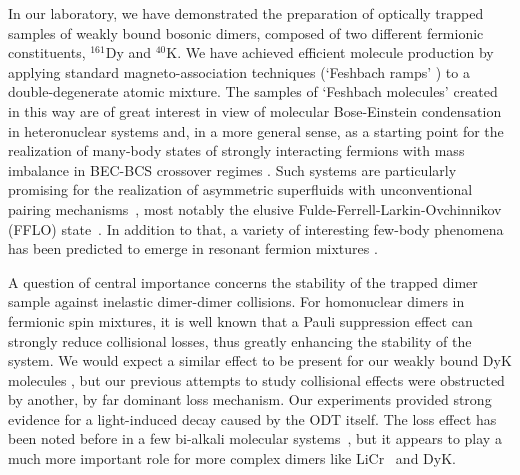 In our laboratory, we have demonstrated \cite{Soave2023otf} the preparation of optically trapped samples of weakly bound bosonic dimers, composed of two different fermionic constituents, $^{161}$Dy and $^{40}$K. We have achieved efficient molecule production by applying standard magneto-association techniques (`Feshbach ramps' \cite{Koehler2006poc, Chin2010fri}) to a double-degenerate atomic mixture. The samples of `Feshbach molecules' created in this way are of great interest in view of molecular Bose-Einstein condensation in heteronuclear systems and, in a more general sense, as a starting point for the realization of many-body states of strongly interacting fermions with mass imbalance in BEC-BCS crossover regimes \cite{Ciamei2022ddf, Ravensbergen2020rif, Ye2025dms}. Such systems are particularly promising for the realization of asymmetric superfluids with unconventional pairing mechanisms~\cite{Gubbels2009lpi, Gubbels2013ifg, Wang2017eeo, Pini2021bmf}, most notably the elusive Fulde-Ferrell-Larkin-Ovchinnikov (FFLO) state~\cite{Fulde1964sia, Larkin1964nss, Radzihovsky2010ifr}. In addition to that, a variety of interesting few-body phenomena has been predicted to emerge in resonant fermion mixtures \cite{Naidon2017epa, Kartavtsev2007let, Zaccanti2022mif}.

A question of central importance concerns the stability of the trapped dimer sample against inelastic dimer-dimer collisions. For homonuclear dimers in fermionic spin mixtures, it is well known that a Pauli suppression effect \cite{Petrov2004wbd, Varenna2006book} can strongly reduce collisional losses, thus greatly enhancing the stability of the system. We would expect a similar effect to be present for our weakly bound DyK molecules \cite{Petrov2005dmi, Jag2016lof}, but our previous attempts to study collisional effects \cite{Soave2023otf} were obstructed by another, by far dominant loss mechanism. Our experiments provided strong evidence for a light-induced decay caused by the ODT itself. The loss effect has been noted before in a few bi-alkali molecular systems~\cite{Chotia2012lld, Zhang2020fas, Spence2023asr}, but it appears to play a much more important role for more complex dimers like LiCr~\cite{Finelli2024ula} and DyK.

